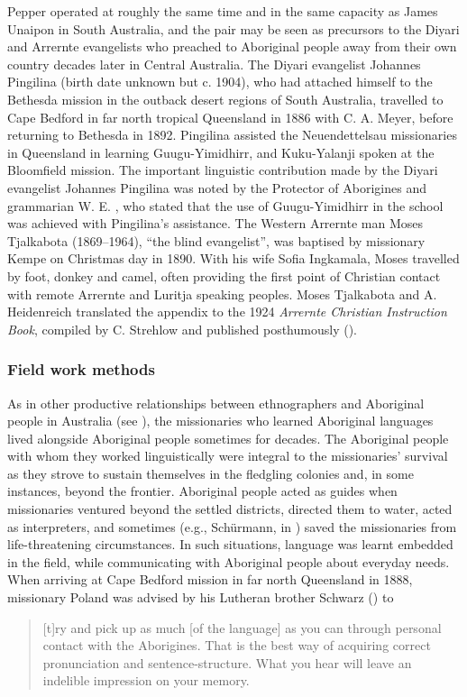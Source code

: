 Pepper operated at roughly the same time and in the same capacity as James Unaipon in South Australia, and the pair may be seen as precursors to the Diyari and Arrernte evangelists who preached to Aboriginal people away from their own country decades later in Central Australia. The Diyari evangelist Johannes Pingilina (birth date unknown but c. 1904), who had attached himself to the Bethesda mission in the outback desert regions of South Australia, travelled to Cape Bedford in far north tropical Queensland in 1886 with C. A. Meyer, before returning to Bethesda in 1892. Pingilina assisted the Neuendettelsau missionaries in Queensland in learning Guugu{\hyp}Yimidhirr, and Kuku-Yalanji spoken at the Bloomfield mission. The important linguistic contribution made by the Diyari evangelist Johannes Pingilina was noted by the Protector of Aborigines and grammarian W. E. \citet[8]{roth_structure_1901}, who stated that the use of Guugu{\hyp}Yimidhirr in the school was achieved with Pingilina’s assistance. The Western Arrernte man Moses Tjalkabota (1869--1964), ``the blind evangelist'', was baptised by missionary Kempe on Christmas day in 1890. With his wife Sofia Ingkamala, Moses travelled by foot, donkey and camel, often providing the first point of Christian contact with remote Arrernte and Luritja speaking peoples. Moses Tjalkabota and A. Heidenreich translated the appendix to the 1924 \textit{Arrernte Christian Instruction Book}, compiled by C. Strehlow and published posthumously ().


\subsubsection{Field work methods}
\label{sec:key:1.1.3.3}

As in other productive relationships between ethnographers and Aboriginal people in Australia (see \citealt[163--193]{Sutton_2009}), the missionaries who learned Aboriginal languages lived alongside Aboriginal people sometimes for decades. The Aboriginal people with whom they worked linguistically were integral to the missionaries’ survival as they strove to sustain themselves in the fledgling colonies and, in some instances, beyond the frontier. Aboriginal people acted as guides when missionaries ventured beyond the settled districts, directed them to water, acted as interpreters, and sometimes (e.g., Schürmann, in \citealt[132]{schurmann_id_1987}) saved the missionaries from life-threatening circumstances. In such situations, language was learnt embedded in the field, while communicating with Aboriginal people about everyday needs. When arriving at Cape Bedford mission in far north Queensland in 1888, missionary Poland was advised by his Lutheran brother Schwarz (\citealt[16]{Poland_1988}) to
\begin{quote}
    [t]ry and pick up as much [of the language] as you can through personal contact with the Aborigines. That is the best way of acquiring correct pronunciation and sentence-structure. What you hear will leave an indelible impression on your memory.
\end{quote}

